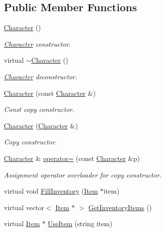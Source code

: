 \subsection*{Public Member Functions}
\begin{DoxyCompactItemize}
\item 
\hyperlink{classCharacter_adc27bdd255876169bad2ed0bae0cffb5}{Character} ()
\begin{DoxyCompactList}\small\item\em \hyperlink{classCharacter}{Character} constructor. \end{DoxyCompactList}\item 
virtual \hyperlink{classCharacter_a9e9be564d05ded80962b2045aa70b3fc}{$\sim$\-Character} ()
\begin{DoxyCompactList}\small\item\em \hyperlink{classCharacter}{Character} deconstructor. \end{DoxyCompactList}\item 
\hyperlink{classCharacter_a40d65bfcf0422cebc44b2e9b01d8fa2b}{Character} (const \hyperlink{classCharacter}{Character} \&)
\begin{DoxyCompactList}\small\item\em Const copy constructor. \end{DoxyCompactList}\item 
\hyperlink{classCharacter_a01a01e1feb04b92658d35e946ae155bb}{Character} (\hyperlink{classCharacter}{Character} \&)
\begin{DoxyCompactList}\small\item\em Copy constructor. \end{DoxyCompactList}\item 
\hyperlink{classCharacter}{Character} \& \hyperlink{classCharacter_aa441f0489c055e79c8dfdd813a20c3ad}{operator=} (const \hyperlink{classCharacter}{Character} \&p)
\begin{DoxyCompactList}\small\item\em Assignment operator overloader for copy constructor. \end{DoxyCompactList}\item 
virtual void \hyperlink{classCharacter_a546635f47f379e4eed59d85d31d85c86}{Fill\-Inventory} (\hyperlink{classItem}{Item} $\ast$item)
\item 
virtual vector$<$ \hyperlink{classItem}{Item} $\ast$ $>$ \hyperlink{classCharacter_a21e35b07fd2bddd94de754f5b8027fcc}{Get\-Inventory\-Items} ()
\item 
virtual \hyperlink{classItem}{Item} $\ast$ \hyperlink{classCharacter_ad13bd70e837024c6f185675d07d28f30}{Use\-Item} (string item)

\end{DoxyCompactItemize}
